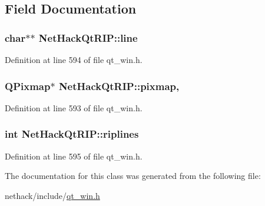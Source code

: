 \subsection{Field Documentation}
\hypertarget{classNetHackQtRIP_a63a0d243b2ea964157cb64db7134af85}{
\subsubsection[{line}]{\setlength{\rightskip}{0pt plus 5cm}char$\ast$$\ast$ Net\+Hack\+Qt\+R\+I\+P\+::line\hspace{0.3cm}{\ttfamily [private]}}}\label{classNetHackQtRIP_a63a0d243b2ea964157cb64db7134af85}


Definition at line 594 of file qt\+\_\+win.\+h.

\hypertarget{classNetHackQtRIP_a8d8ea98aca5f49a7d714e78b2e2e72c8}{
\subsubsection[{pixmap}]{\setlength{\rightskip}{0pt plus 5cm}Q\+Pixmap$\ast$ Net\+Hack\+Qt\+R\+I\+P\+::pixmap\hspace{0.3cm}{\ttfamily [static]}, {\ttfamily [private]}}}\label{classNetHackQtRIP_a8d8ea98aca5f49a7d714e78b2e2e72c8}


Definition at line 593 of file qt\+\_\+win.\+h.

\hypertarget{classNetHackQtRIP_a5f98b6ff5ecea13f3e9291e08c1817d9}{
\subsubsection[{riplines}]{\setlength{\rightskip}{0pt plus 5cm}int Net\+Hack\+Qt\+R\+I\+P\+::riplines\hspace{0.3cm}{\ttfamily [private]}}}\label{classNetHackQtRIP_a5f98b6ff5ecea13f3e9291e08c1817d9}


Definition at line 595 of file qt\+\_\+win.\+h.



The documentation for this class was generated from the following file\+:\begin{DoxyCompactItemize}
\item 
nethack/include/\hyperlink{qt__win_8h}{qt\+\_\+win.\+h}\end{DoxyCompactItemize}
